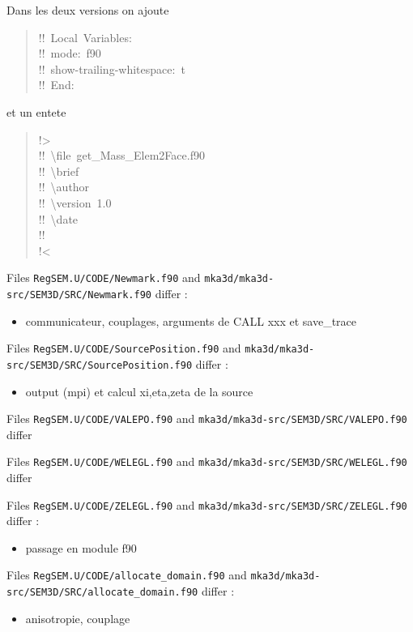 \documentclass[10pt,a4paper,english]{article}
\begin{document}
Dans les deux versions on ajoute
\begin{quote}{\ttfamily \raggedright \noindent
!!~Local~Variables:~\\
!!~mode:~f90~\\
!!~show-trailing-whitespace:~t~\\
!!~End:
}\end{quote}

et un entete
\begin{quote}{\ttfamily \raggedright \noindent
!>~\\
!!~{\textbackslash}file~get{\_}Mass{\_}Elem2Face.f90~\\
!!~{\textbackslash}brief~\\
!!~{\textbackslash}author~\\
!!~{\textbackslash}version~1.0~\\
!!~{\textbackslash}date~\\
!!~\\
!<
}\end{quote}

Files \texttt{RegSEM.U/CODE/Newmark.f90} and \texttt{mka3d/mka3d-src/SEM3D/SRC/Newmark.f90} differ :
\begin{itemize}
\item {} 
communicateur, couplages, arguments de CALL xxx et save{\_}trace

\end{itemize}

Files \texttt{RegSEM.U/CODE/SourcePosition.f90} and \texttt{mka3d/mka3d-src/SEM3D/SRC/SourcePosition.f90} differ :
\begin{itemize}
\item {} 
output (mpi) et calcul xi,eta,zeta de la source

\end{itemize}

Files \texttt{RegSEM.U/CODE/VALEPO.f90} and \texttt{mka3d/mka3d-src/SEM3D/SRC/VALEPO.f90} differ

Files \texttt{RegSEM.U/CODE/WELEGL.f90} and \texttt{mka3d/mka3d-src/SEM3D/SRC/WELEGL.f90} differ

Files \texttt{RegSEM.U/CODE/ZELEGL.f90} and \texttt{mka3d/mka3d-src/SEM3D/SRC/ZELEGL.f90} differ :
\begin{itemize}
\item {} 
passage en module f90

\end{itemize}

Files \texttt{RegSEM.U/CODE/allocate{\_}domain.f90} and \texttt{mka3d/mka3d-src/SEM3D/SRC/allocate{\_}domain.f90} differ :
\begin{itemize}
\item {} 
anisotropie, couplage

\end{itemize}
\end{document}
